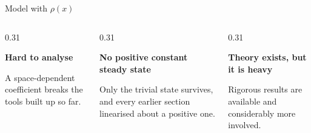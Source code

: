 \begin{frame}{Model with $\rho(x)$}
  \vspace{0.24cm}

  \begin{columns}[T,onlytextwidth]

    \begin{column}{0.31\textwidth}
      {\color{HydraWhite}\bfseries\fontsize{8.0}{9.8}\selectfont
        Hard to analyse\par}
      \vspace{-0.04cm}
      {\color{HydraBody}\fontsize{6.6}{8.3}\selectfont
        A space-dependent coefficient breaks the tools built up so far.\par}
    \end{column}

    \begin{column}{0.31\textwidth}
      {\color{HydraWhite}\bfseries\fontsize{8.0}{9.8}\selectfont
        No positive constant steady state\par}
      \vspace{-0.04cm}
      {\color{HydraBody}\fontsize{6.6}{8.3}\selectfont
        Only the trivial state survives, and every earlier section
        linearised about a positive one.\par}
    \end{column}

    \begin{column}{0.31\textwidth}
      {\color{HydraWhite}\bfseries\fontsize{8.0}{9.8}\selectfont
        Theory exists, but it is heavy\par}
      \vspace{-0.04cm}
      {\color{HydraBody}\fontsize{6.6}{8.3}\selectfont
        Rigorous results are available and considerably more involved.\par}
    \end{column}

  \end{columns}

\end{frame}




